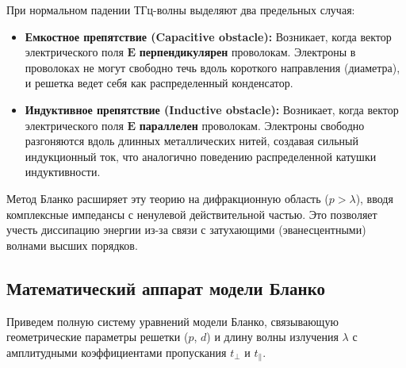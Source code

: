 При нормальном падении ТГц-волны выделяют два предельных случая:
\begin{itemize}
    \item \textbf{Емкостное препятствие (Capacitive obstacle):} Возникает, когда вектор электрического поля $\mathbf{E}$ \textbf{перпендикулярен} проволокам. Электроны в проволоках не могут свободно течь вдоль короткого направления (диаметра), и решетка ведет себя как распределенный конденсатор.
    \item \textbf{Индуктивное препятствие (Inductive obstacle):} Возникает, когда вектор электрического поля $\mathbf{E}$ \textbf{параллелен} проволокам. Электроны свободно разгоняются вдоль длинных металлических нитей, создавая сильный индукционный ток, что аналогично поведению распределенной катушки индуктивности.
\end{itemize}

Метод Бланко расширяет эту теорию на дифракционную область ($p > \lambda$), вводя комплексные импедансы с ненулевой действительной частью. Это позволяет учесть диссипацию энергии из-за связи с затухающими (эванесцентными) волнами высших порядков.

\subsection{Математический аппарат модели Бланко}

Приведем полную систему уравнений модели Бланко, связывающую геометрические параметры решетки ($p$, $d$) и длину волны излучения $\lambda$ с амплитудными коэффициентами пропускания $t_\perp$ и $t_\parallel$.

